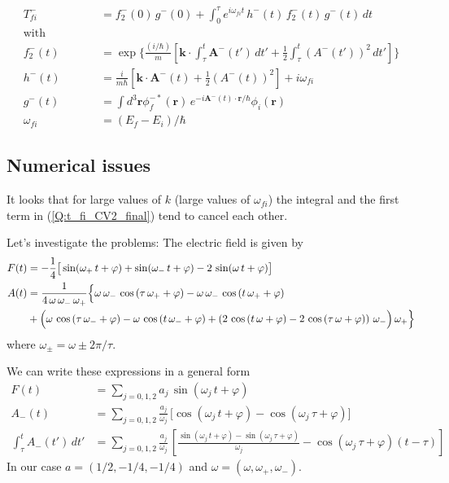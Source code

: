 \begin{subequations}
  \begin{align} \label{Q:t_fi_CV2_final}
    T_{fi}^{-}&= f_{2}^{-}(0)\, g^{-}(0) + \int_{0}^{\tau} e^{i\omega_{fi}t} \, h^{-}(t)\, f_{2}^{-}(t)\, g^{-}(t)\, dt \\
    \mathrm{with} \qquad \qquad & \nonumber \\
    f_{2}^{-}(t) &= \exp{\Biggl\{\frac{(i/\hbar)}{m} \left[ \bm{k} \cdot \int_{\tau}^{t} \bm{A}^{-}(t')\, dt' + \frac{1}{2}\int_{\tau}^{t} \left( A^{-}(t') \right)^{2}\, dt' \right]
      \Biggr\} } \\
h^{-}(t) &= \frac{i}{m \hbar} \left[ \bm{k} \cdot \bm{A}^{-}(t) + \frac{1}{2} \left( A^{-}(t) \right)^{2} \right] + i \omega_{fi} \\
g^{-}(t) &= \int d^{3}\bm{r} \phi^{-*}_{f}(\bm{r}) \, e^{-i \bm{A}^{-}(t) \cdot \bm{r}/\hbar} \phi_{i}(\bm{r})\\
\omega_{fi}&=   (E_{f}-E_{i})/\hbar \nonumber
  \end{align}
\end{subequations}

\subsection{Numerical issues}
\label{S:numerical-issues}

It looks that for large values of $k$ (large values of $\omega_{fi}$) the integral and the first term in (\ref{Q:t_fi_CV2_final}) tend to cancel each other.

Let's investigate the problems:
The electric field is given by
\begin{align}
F(t)&= -\frac{1}{4} \big[\sin( \omega_{+}\,t + \varphi) + \sin( \omega_{-}\,t + \varphi) - 2 \,\sin( \omega \,t + \varphi ) \big]\\
A(t)&=
\frac{1}{4\,\omega\,\omega_{-}\,\omega_{+}}\Big\{\omega\,\omega_{-}\,\cos\left( \tau\,\omega_{+}+\varphi\right) -\omega\,\omega_{-}\,\cos\left( t\,\omega_{+}+\varphi\right) \notag \\
&+\Big( \omega\,\cos\left( \tau\,\omega_{-}+\varphi\right) -\omega\,\cos\left( t\,\omega_{-}+\varphi\right) + 
\left( 2\,\cos\left( t\,\omega+\varphi\right) -2\,\cos\left( \tau\,\omega+\varphi\right) \right) \,\omega_{-}\Big) \,\omega_{+}\Big\}
\end{align}
where $\omega_{\pm}= \omega \pm 2 \pi/\tau$.

We can write these expressions in a general form
\begin{align}
F(t) &= \sum_{j=0,1,2} a_{j}\, \sin(\omega_{j}\,t + \varphi)\\
A_{-}(t) &= \sum_{j=0,1,2} \frac{a_{j}}{\omega_{j}}\, \big[\cos(\omega_{j}\,t + \varphi) - \cos(\omega_{j}\,\tau + \varphi)\big]\\
\int_{\tau}^{t} A_{-}(t')\, dt' &= \sum_{j=0,1,2} \frac{a_{j}}{\omega_{j}}\, \left[\frac{\sin(\omega_{j}\,t + \varphi) - \sin(\omega_{j}\,\tau + \varphi)}{\omega_{j}} - \cos(\omega_{j}\,\tau + \varphi)(t-\tau)\right]
\end{align}
In our case $a=(1/2,-1/4,-1/4)$ and $\omega=(\omega, \omega_{+}, \omega_{-})$.

